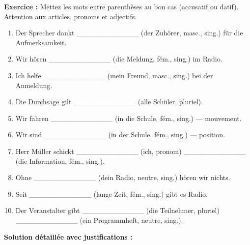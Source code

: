 \documentclass[11pt]{article}
\begin{document}
\begin{exoresolu}
\textbf{Exercice :} Mettez les mots entre parenthèses au bon cas (accusatif ou datif). Attention aux articles, pronoms et adjectifs.

\begin{enumerate}
    \item Der Sprecher dankt \_\_\_\_\_\_\_\_\_\_\_\_ (der Zuhörer, masc., sing.) für die Aufmerksamkeit.
    \item Wir hören \_\_\_\_\_\_\_\_\_\_\_\_ (die Meldung, fém., sing.) im Radio.
    \item Ich helfe \_\_\_\_\_\_\_\_\_\_\_\_ (mein Freund, masc., sing.) bei der Anmeldung.
    \item Die Durchsage gilt \_\_\_\_\_\_\_\_\_\_\_\_ (alle Schüler, pluriel).
    \item Wir fahren \_\_\_\_\_\_\_\_\_\_\_\_ (in die Schule, fém., sing.) — mouvement.
    \item Wir sind \_\_\_\_\_\_\_\_\_\_\_\_ (in der Schule, fém., sing.) — position.
    \item Herr Müller schickt \_\_\_\_\_\_\_\_\_\_\_\_ (ich, pronom) \_\_\_\_\_\_\_\_\_\_\_\_ (die Information, fém., sing.).
    \item Ohne \_\_\_\_\_\_\_\_\_\_\_\_ (dein Radio, neutre, sing.) hören wir nichts.
    \item Seit \_\_\_\_\_\_\_\_\_\_\_\_ (lange Zeit, fém., sing.) gibt es Radio.
    \item Der Veranstalter gibt \_\_\_\_\_\_\_\_\_\_\_\_ (die Teilnehmer, pluriel) \_\_\_\_\_\_\_\_\_\_\_\_ (ein Programmheft, neutre, sing.).
\end{enumerate}

\tcblower
\textbf{Solution détaillée avec justifications :}


\end{exoresolu}
\end{document}
